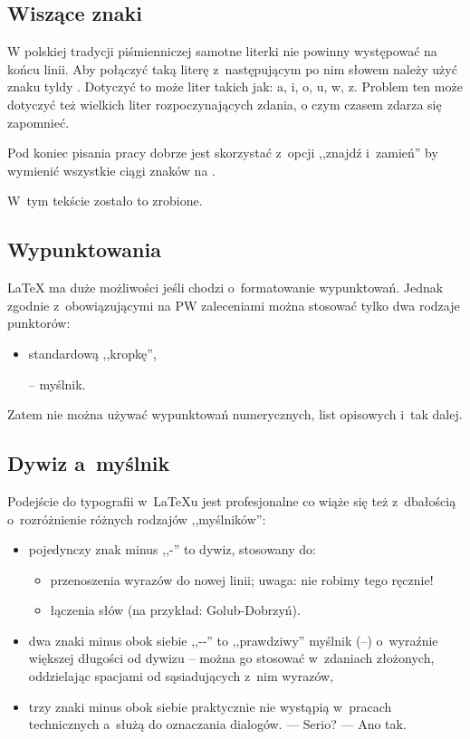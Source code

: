 \subsection{Wiszące znaki}
W polskiej tradycji piśmienniczej samotne literki nie powinny występować na końcu linii. Aby połączyć taką literę z~następującym po nim słowem należy użyć znaku tyldy \keys{\textasciitilde{}}. Dotyczyć to może liter takich jak: a, i, o, u, w, z. Problem ten może dotyczyć też wielkich liter rozpoczynających zdania, o czym czasem zdarza się zapomnieć.


Pod koniec pisania pracy dobrze jest skorzystać z~opcji ,,znajdź i~zamień'' by wymienić wszystkie ciągi znaków  na .

W~tym tekście zostało to zrobione.

\subsection{Wypunktowania}
\LaTeX{} ma duże możliwości jeśli chodzi o~formatowanie wypunktowań. Jednak zgodnie z~obowiązującymi na PW zaleceniami można stosować tylko dwa rodzaje punktorów:
\begin{itemize}
    \item standardową ,,kropkę'',
    \item[--] myślnik.
\end{itemize}
Zatem nie można używać wypunktowań numerycznych, list opisowych i~tak dalej.


\subsection{Dywiz a~myślnik}
Podejście do typografii w~\LaTeX{u} jest profesjonalne co wiąże się też z~dbałością o~rozróżnienie różnych rodzajów ,,myślników'':
\begin{itemize}
    \item pojedynczy znak minus ,,-'' to dywiz, stosowany do:
          \begin{itemize}
              \item przenoszenia wyrazów do nowej linii; uwaga: nie robimy tego ręcznie!
              \item łączenia słów (na przykład: Golub-Dobrzyń).
          \end{itemize}
    \item dwa znaki minus obok siebie ,,-{}-'' %
          to ,,prawdziwy'' myślnik (--) o~wyraźnie większej długości od dywizu -- można go stosować w~zdaniach złożonych, oddzielając spacjami od sąsiadujących z~nim wyrazów,
    \item trzy znaki minus obok siebie praktycznie nie wystąpią w~pracach technicznych a~służą do oznaczania dialogów. --- Serio? --- Ano tak.
\end{itemize}

